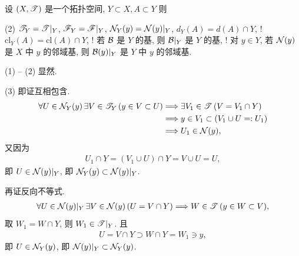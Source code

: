     \begin{Proposition}[子空间中集合的拓扑运算]
        设 $ (X, \mathscr{T}) $ 是一个拓扑空间, $ Y\subset X, A\subset Y $ 则
        \begin{lpbn}(2)
            \task $ \mathscr{T}_{Y}=\mathscr{T}|_{Y} $,
            \task $ \mathscr{F}_{Y}=\mathscr{F}|_{Y} $,
            \task $ \mathcal{N}_{Y}(y)=\mathcal{N}(y)|_{Y} $,
            \task $ d_{Y}(A)=d(A)\cap Y $,
            \task! $ \mathrm{cl}_{Y}(A)=\mathrm{cl}(A)\cap Y $,
            \task! 若 $ \mathcal{B} $ 是 $ Y $ 的基, 则 $ \mathcal{B}|_{Y} $ 是 $ Y $ 的基,
            \task! 对 $ y\in Y $, 若 $ \mathcal{N}(y) $ 是 $ X $ 中 $ y $ 的邻域基, 则 $ \mathcal{B}(y)|_{Y} $ 是 $ Y $ 中 $ y $ 的邻域基. 
        \end{lpbn}
    \end{Proposition}
    \begin{Proof}
        (1) -- (2) 显然.
        
        (3) 即证互相包含. 
        \begin{align*}
            \forall U\in\mathcal{N}_{Y}(y)\,\exists V\in\mathscr{T}_{Y}\,(y\in V\subset U) & \Longrightarrow \exists V_{1}\in\mathscr{T}\,(V=V_{1}\cap Y)\\
            & \Longrightarrow y\in V_{1}\subset(V_{1}\cup U=:U_{1})\\
            & \Longrightarrow U_{1}\in\mathcal{N}(y),
        \end{align*}
        又因为
        \begin{align*}
            U_{1}\cap Y=(V_{1}\cup U)\cap Y=V\cup U=U,
        \end{align*}
        即 $ U\in\mathcal{N}(y)|_{Y} $, 即 $ \mathcal{N}_{Y}(y)\subset \mathcal{N}(y)|_{Y} $.

        再证反向不等式.
        \begin{align*}
            \forall U\in\mathcal{N}(y)|_{Y}\,\exists V\in\mathcal{N}(y)\,(U=V\cap Y)\Longrightarrow W\in\mathscr{T}\,(y\in W\subset V),
        \end{align*}
        取 $ W_{1}=W\cap Y $, 则 $ W_{1}\in\mathscr{T}|_{Y} $. 且
        \begin{align*}
            U=V\cap Y\supset W\cap Y=W_{1}\ni y,
        \end{align*}
        即 $ U\in\mathcal{N}_{Y}(y) $, 即 $ \mathcal{N}(y)|_{Y}\subset \mathcal{N}_{Y}(y) $.


\end{Proof}
